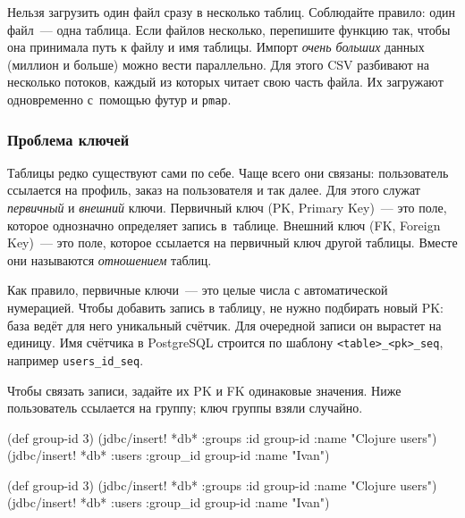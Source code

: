 \fi

Нельзя загрузить один файл сразу в несколько таблиц. Соблюдайте правило: один
файл~--- одна таблица. Если файлов несколько, перепишите функцию так, чтобы она
принимала путь к файлу и имя таблицы. Импорт \emph{очень больших} данных
(миллион и больше) можно вести параллельно. Для этого CSV разбивают на несколько
потоков, каждый из которых читает свою часть файла. Их загружают одновременно
с~помощью футур и \verb|pmap|.

\subsubsection*{Проблема ключей}



Таблицы редко существуют сами по себе. Чаще всего они связаны: пользователь
ссылается на профиль, заказ на пользователя и так далее. Для этого служат
\emph{первичный} и \emph{внешний} ключи. Первичный ключ (PK, Primary Key)~--- это
поле, которое однозначно определяет запись в~таблице. Внешний ключ (FK, Foreign
Key)~--- это поле, которое ссылается на первичный ключ другой таблицы. Вместе они
называются \emph{отношением} таблиц.


Как правило, первичные ключи~--- это целые числа с автоматической нумерацией. Чтобы
добавить запись в таблицу, не нужно подбирать новый PK: база ведёт для него
уникальный счётчик. Для очередной записи он вырастет на единицу. Имя счётчика в
PostgreSQL строится по шаблону \verb|<table>_<pk>_seq|, например
\verb|users_id_seq|.

Чтобы связать записи, задайте их PK и FK одинаковые значения. Ниже пользователь
ссылается на группу; ключ группы взяли случайно.

\ifx\devicetype\mobile

\begin{english}
  \begin{clojure}
(def group-id 3)
(jdbc/insert! *db* :groups
  {:id group-id :name "Clojure users"})
(jdbc/insert! *db* :users
  {:group_id group-id :name "Ivan"})
  \end{clojure}
\end{english}

\else

\begin{english}
  \begin{clojure}
(def group-id 3)
(jdbc/insert! *db* :groups {:id group-id :name "Clojure users"})
(jdbc/insert! *db* :users {:group_id group-id :name "Ivan"})
  \end{clojure}
\end{english}

